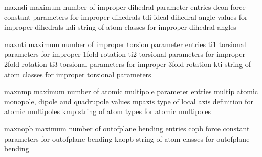 \documentclass[letterpaper,11pt,english]{sphinxmanual}
\begin{document}

\begin{sphinxVerbatim}[commandchars=\\\{\}]
maxndi          maximum number of improper dihedral parameter entries
dcon            force constant parameters for improper dihedrals
tdi             ideal dihedral angle values for improper dihedrals
kdi             string of atom classes for improper dihedral angles
\end{sphinxVerbatim}


\begin{sphinxVerbatim}[commandchars=\\\{\}]
maxnti          maximum number of improper torsion parameter entries
ti1             torsional parameters for improper 1\PYGZhy{}fold rotation
ti2             torsional parameters for improper 2\PYGZhy{}fold rotation
ti3             torsional parameters for improper 3\PYGZhy{}fold rotation
kti             string of atom classes for improper torsional parameters
\end{sphinxVerbatim}


\begin{sphinxVerbatim}[commandchars=\\\{\}]
maxnmp          maximum number of atomic multipole parameter entries
multip          atomic monopole, dipole and quadrupole values
mpaxis          type of local axis definition for atomic multipoles
kmp             string of atom types for atomic multipoles
\end{sphinxVerbatim}


\begin{sphinxVerbatim}[commandchars=\\\{\}]
maxnopb         maximum number of out\PYGZhy{}of\PYGZhy{}plane bending entries
copb            force constant parameters for out\PYGZhy{}of\PYGZhy{}plane bending
kaopb           string of atom classes for out\PYGZhy{}of\PYGZhy{}plane bending
\end{sphinxVerbatim}

\end{document}

